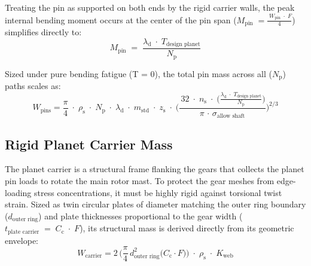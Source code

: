         Treating the pin as supported on both ends by the rigid carrier walls, the peak internal 
        bending moment occurs at the center of the pin span ($M_{\text{pin}}\;=\frac{\;W_{\text{pin}}\;\cdot\;F}{4}$) 
        simplifies directly to:
            \begin{equation}
                \label{eq:pinmoment}
                M_{\text{pin}}
                \;=\;
                \frac{\lambda_{\text{d}}\;\cdot\;T_{\text{design planet}}}{N_{\text{p}}}
            \end{equation}

        Sized under pure bending fatigue (T = 0), the total pin mass across all ($N_{\text{p}}$) paths scales as: 
            \begin{equation}
                \label{eq:pinsmass}
                W_{\text{pins}} =
                \frac{\pi}{4}\;
                \cdot\; \rho_{\text{s}}
                \;\cdot\; N_{\text{p}}
                \;\cdot\; \lambda_{\text{d}}
                \;\cdot\; m_{\text{std}}
                \;\cdot\; z_{\text{s}}
                \;\cdot\;
                \biggl(\frac{\,32\;\cdot\;n_{\text{s}}\;\cdot\;
                \bigl(\frac{\lambda_{\text{d}}\;\cdot\;T_{\text{design planet}}}{N_{\text{p}}}\bigr)}
                {\pi\,\cdot\,\sigma_{\text{allow shaft}}}\biggr)^{2/3}
            \end{equation}

    \subsection{Rigid Planet Carrier Mass}
        The planet carrier is a structural frame flanking the gears that collects the planet pin loads to rotate 
        the main rotor mast. To protect the gear meshes from edge-loading stress concentrations, it must be highly 
        rigid against torsional twist strain. Sized as twin circular plates of diameter matching the outer 
        ring boundary ($d_{\text{outer ring}}$) and plate thicknesses proportional to 
        the gear width ($t_{\text{plate carrier}}\;=\;C_{\text{c}}\;\cdot\;F$), its structural mass is 
        derived directly from its geometric envelope:
            \begin{equation}
                \label{eq:carriermassa}
                W_{\text{carrier}}
                = 2\,\bigl(\frac{\pi}{4}\,d_{\text{outer ring}}^{2}
                \bigl(C_{\text{c}}\!\cdot\!F\bigr)\bigr)
                \;\cdot\;\rho_{\text{s}}\;\cdot\;K_{\text{web}}
            \end{equation}
    
